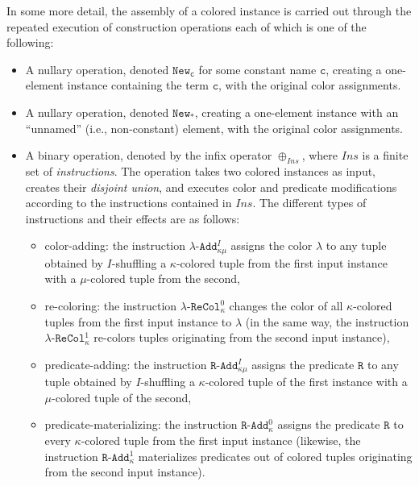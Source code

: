 \documentclass[10pt,a4paper]{amsart}
\theoremstyle{definition}
\numberwithin{equation}{section}
\theoremstyle{plain}
\theoremstyle{definition}
\theoremstyle{myexample}
\theoremstyle{plain}
\theoremstyle{definition}
\newcommand{\newconst}[1]{\pred{New}_{\const{#1}}} %
\newcommand{\newanon}{\pred{New}_{\const{*}}} %
\newcommand{\cadd}[4]{#4\pred{\texttt{-}Add}^{#3}_{#1#2}} %
\newcommand{\radd}[4]{#4\pred{\texttt{-}Add}^{#3}_{#1#2}}
\newcommand{\unradd}[2]{#2\pred{\texttt{-}Add}_{#1}}
\newcommand{\recol}[2]{#2\pred{\texttt{-}ReCol}_{#1}}
\newcommand{\pred}[1]{\mathtt{#1}}
\newcommand{\const}[1]{\mathtt{#1}}
\newcommand{\rpred}{\pred{R}}
\begin{document}
In some more detail, the assembly of a colored instance is carried out through the repeated execution of construction operations each of which is one of the following:
\begin{itemize}
	\item A nullary operation, denoted $\newconst{c}$ for some constant name $\const{c}$, creating a one-element instance containing the term $\const{c}$, with the original color assignments.
	\item A nullary operation, denoted $\newanon$,  creating a one-element instance with an ``unnamed'' (i.e., non-constant) element, with the original color assignments.
	\item A binary operation, denoted by the infix operator $\oplus_{\mathit{Ins}}$, where $\mathit{Ins}$ is a finite set of \emph{instructions}.
	The operation takes two colored instances as input, creates their \emph{disjoint union}, and executes color and predicate modifications according to the instructions contained in $\mathit{Ins}$. The different types of instructions and their effects are as follows:
	\begin{itemize}
		\item color-adding: the instruction $\cadd{\kappa}{\mu}{I}{\lambda}$ assigns the color $\lambda$ to any tuple obtained by $I$-shuffling a $\kappa$-colored tuple from the first input instance with a $\mu$-colored tuple from the second,   
		\item re-coloring: the instruction $\recol{\kappa}{\lambda}^0$ changes the color of all $\kappa$-colored tuples from the first input instance to $\lambda$ (in the same way, the instruction $\recol{\kappa}{\lambda}^1$ re-colors tuples originating from the second input instance),		
		\item predicate-adding: the instruction $\radd{\kappa}{\mu}{I}{\rpred}$ assigns the predicate $\rpred$ to any tuple obtained by $I$-shuffling a $\kappa$-colored tuple of the first instance with a $\mu$-colored tuple of the second,
		\item predicate-materializing: the instruction $\unradd{\kappa}{\rpred}^0$ assigns the predicate $\rpred$ to every $\kappa$-colored tuple from the first input instance (likewise, the instruction $\unradd{\kappa}{\rpred}^1$ materializes predicates out of colored tuples originating from the second input instance).         
	\end{itemize}
	\end{itemize}

\end{document}
